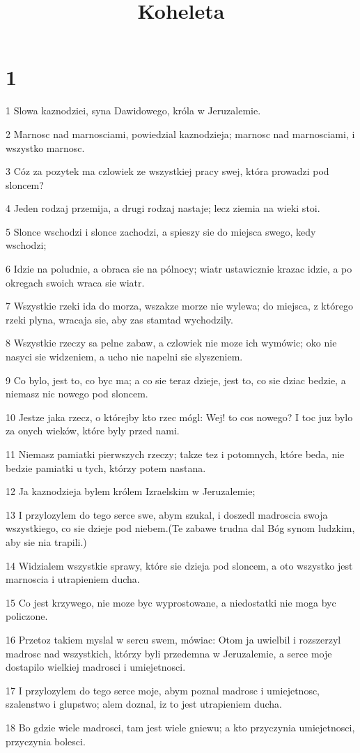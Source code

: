 

\title{Koheleta}


\chapter{1}

\par 1 Slowa kaznodziei, syna Dawidowego, króla w Jeruzalemie.
\par 2 Marnosc nad marnosciami, powiedzial kaznodzieja; marnosc nad marnosciami, i wszystko marnosc.
\par 3 Cóz za pozytek ma czlowiek ze wszystkiej pracy swej, która prowadzi pod sloncem?
\par 4 Jeden rodzaj przemija, a drugi rodzaj nastaje; lecz ziemia na wieki stoi.
\par 5 Slonce wschodzi i slonce zachodzi, a spieszy sie do miejsca swego, kedy wschodzi;
\par 6 Idzie na poludnie, a obraca sie na pólnocy; wiatr ustawicznie krazac idzie, a po okregach swoich wraca sie wiatr.
\par 7 Wszystkie rzeki ida do morza, wszakze morze nie wylewa; do miejsca, z którego rzeki plyna, wracaja sie, aby zas stamtad wychodzily.
\par 8 Wszystkie rzeczy sa pelne zabaw, a czlowiek nie moze ich wymówic; oko nie nasyci sie widzeniem, a ucho nie napelni sie slyszeniem.
\par 9 Co bylo, jest to, co byc ma; a co sie teraz dzieje, jest to, co sie dziac bedzie, a niemasz nic nowego pod sloncem.
\par 10 Jestze jaka rzecz, o którejby kto rzec mógl: Wej! to cos nowego? I toc juz bylo za onych wieków, które byly przed nami.
\par 11 Niemasz pamiatki pierwszych rzeczy; takze tez i potomnych, które beda, nie bedzie pamiatki u tych, którzy potem nastana.
\par 12 Ja kaznodzieja bylem królem Izraelskim w Jeruzalemie;
\par 13 I przylozylem do tego serce swe, abym szukal, i doszedl madroscia swoja wszystkiego, co sie dzieje pod niebem.(Te zabawe trudna dal Bóg synom ludzkim, aby sie nia trapili.)
\par 14 Widzialem wszystkie sprawy, które sie dzieja pod sloncem, a oto wszystko jest marnoscia i utrapieniem ducha.
\par 15 Co jest krzywego, nie moze byc wyprostowane, a niedostatki nie moga byc policzone.
\par 16 Przetoz takiem myslal w sercu swem, mówiac: Otom ja uwielbil i rozszerzyl madrosc nad wszystkich, którzy byli przedemna w Jeruzalemie, a serce moje dostapilo wielkiej madrosci i umiejetnosci.
\par 17 I przylozylem do tego serce moje, abym poznal madrosc i umiejetnosc, szalenstwo i glupstwo; alem doznal, iz to jest utrapieniem ducha.
\par 18 Bo gdzie wiele madrosci, tam jest wiele gniewu; a kto przyczynia umiejetnosci, przyczynia bolesci.

